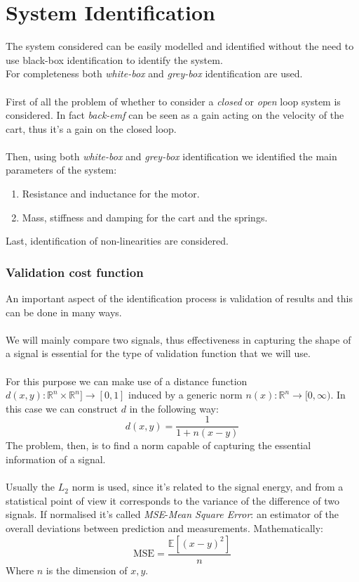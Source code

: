 \chapter{System Identification}
The system considered can be easily modelled and identified without the need to use black-box identification to identify the system. \\ For completeness both \emph{white-box} and \emph{grey-box} identification are used.\\ \\
First of all the problem of whether to consider a \emph{closed} or \emph{open} loop system is considered. In fact \emph{back-emf} can be seen as a gain acting on the velocity of the cart, thus it's a gain on the closed loop.\\ \\
Then, using both \emph{white-box} and \emph{grey-box} identification we identified the main parameters of the system: 
\begin{enumerate}
\item Resistance and inductance for the motor.
\item Mass, stiffness and damping for the cart and the springs.
\end{enumerate}
Last, identification of non-linearities are considered.
\subsection{Validation cost function}
An important aspect of the identification process is validation of results and this can be done in many ways. \\ \\
We will mainly compare two signals, thus effectiveness in capturing the shape of  a signal is essential for the type of validation function that we will use. \\  \\
For this purpose we can make use of a distance function $d(x,y): \mathbb{R}^n \times \mathbb{R}^n]\to [0,1]$ induced by a generic norm $n(x) : \mathbb{R}^n \to [0,\infty)$. In this case we can construct $d$ in the following way:
$$d(x,y) = \frac{1}{1+n(x-y)}$$
 The problem, then, is to find a norm capable of capturing the essential information of a signal. \\ \\Usually the $L_2$ norm is used, since it's related to the signal energy, and from a statistical point of view it corresponds to the variance of the difference of two signals. If normalised it's called \emph{MSE}-\emph{Mean Square Error}: an estimator of the overall deviations between prediction and measurements. Mathematically:
$$\text{MSE} =  \frac{\mathbb{E}[(x-y)^2]}{n}$$
Where $n$ is the dimension of $x,y$.

